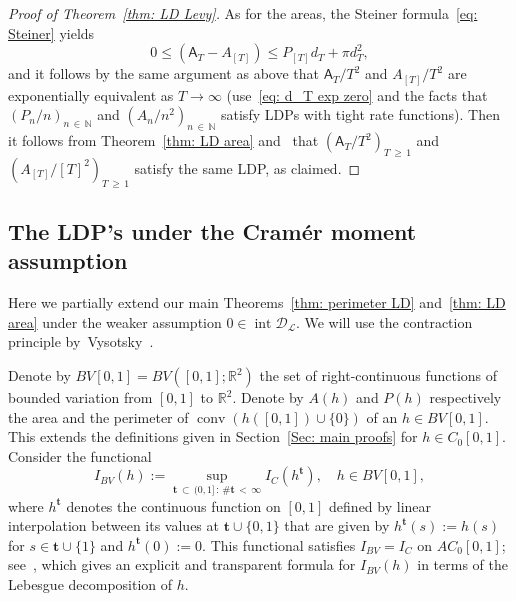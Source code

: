 \documentclass[10pt]{amsart}
\theoremstyle{definition}\newtheorem{defi}[theo]{Definition}\newtheorem{rema}[theo]{Remark}\newtheorem{exam}[theo]{Example}\newtheorem{exem}[theo]{Example}\newtheorem{nota}[theo]{Notation}
\DeclareMathOperator{\conv}{conv}
\DeclareMathOperator{\intr}{int}
\newcommand{\Rbb}{\mathbb{R}}
\newcommand{\N}{\mathbb{N}}
\newcommand{\Dcl}{\mathcal{D}}
\newcommand{\Lcl}{\mathcal{L}}
\newcommand{\bft}{\mathbf{t}}
\newcommand{\sfA}{\mathsf{A}}
\begin{document}
\begin{proof}[Proof of Theorem~\ref{thm: LD Levy}]
As for the areas, the Steiner formula~\eqref{eq: Steiner} yields
\[
0 \le \left(\sfA_T - A_{[T]}\right) \le P_{[T] } d_T + \pi d_T^2,
\]
and it follows by the same argument as above that $\sfA_T/T^2 $ and $ A_{[T]}/T^2 $ are exponentially equivalent as $T \to \infty$ (use~\eqref{eq: d_T exp zero} and the facts that $ (P_n/n)_{n\,\in\,\N} $ and $ (A_n/n^2)_{n\,\in\,\N} $ satisfy LDPs with tight rate functions). Then it follows from Theorem~\ref{thm: LD area} and~\cite[Theorem~4.2.13]{DemboZeitouni} that $(\sfA_T/T^2)_{T\,\ge\,1} $ and $ (A_{[T]}/[T]^2)_{T\,\ge\,1} $ satisfy the same LDP, as claimed.
\end{proof}

\subsection{The LDP's under the Cram\'er moment assumption} \label{sec: LDP Cramer}
Here we partially extend our main Theorems~\ref{thm: perimeter LD} and~\ref{thm: LD area} under the weaker assumption $0 \in \intr \Dcl_{\Lcl}$. We will use the contraction principle by~Vysotsky~\cite{VysotskyNote}.


Denote by $BV[0,1]=BV([0,1];\Rbb^2)$ the set of right-continuous functions of bounded variation from $[0,1]$ to $\Rbb^2$. Denote by $A(h)$ and $P(h)$ respectively the area and the perimeter of $\conv(h([0,1]) \cup \{ 0 \}) $ of an $h \in BV[0,1]$. This extends the definitions given in Section~\ref{Sec: main proofs} for $h \in C_0[0,1]$. Consider the functional
\begin{equation}\label{eq: I BV}
I_{BV}(h):= \sup_{\bft\,\subset\,(0,1]\,: \, \# \bft\,<\,\infty } I_C(h^{\bft}), \quad h \in BV[0,1],
\end{equation}
where $h^{\bft}$ denotes the continuous function on $[0,1]$ defined by linear interpolation between its values at $\bft \cup \{0,1\}$ that are given by $h^{\bft}(s) := h(s)$ for $s \in \bft \cup \{1\}$ and $h^{\bft}(0):=0$. This functional satisfies $I_{BV}=I_C$ on $AC_0[0,1]$; see~\cite[Theorem~5.1]{VysotskyNote}, which gives an explicit 
and transparent formula for $I_{BV}(h)$ in terms of the Lebesgue decomposition of $h$.
\end{document}
